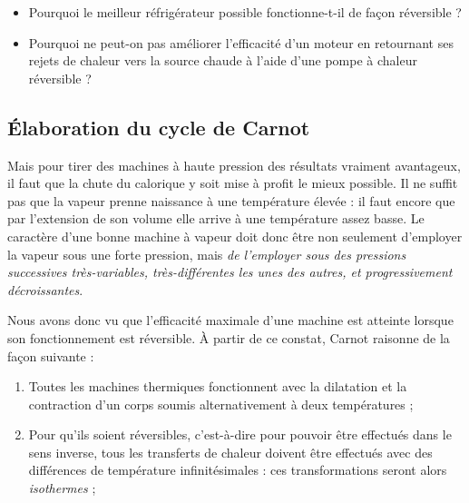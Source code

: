 		\begin{itemize}
			\item Pourquoi le meilleur réfrigérateur possible fonctionne-t-il de façon réversible ?
			\item Pourquoi ne peut-on pas améliorer l’efficacité d’un moteur en retournant ses rejets de chaleur vers la source chaude à l’aide d’une pompe à chaleur réversible ?
		\end{itemize}


	\subsection{Élaboration du cycle de Carnot}
	\label{ch_elaboration_cycle_carnot}

			Mais pour tirer des machines à haute pression des résultats vraiment avantageux, il faut que la chute du calorique y soit mise à profit le mieux possible. Il ne suffit pas que la vapeur prenne naissance à une température élevée : il faut encore que par l’extension de son volume elle arrive à une température assez basse. Le caractère d’une bonne machine à vapeur doit donc être non seulement d’employer la vapeur sous une forte pression, mais \emph{de l’employer sous des pressions successives très-variables, très-différentes les unes des autres, et progressivement décroissantes}.
		
		Nous avons donc vu que l’efficacité maximale d’une machine est atteinte lorsque son fonctionnement est réversible. À partir de ce constat, Carnot raisonne de la façon suivante :

		\begin{enumerate}
			\item Toutes les machines thermiques fonctionnent avec la dilatation et la contraction d’un corps soumis alternativement à deux températures ;
			\item Pour qu’ils soient réversibles, c’est-à-dire pour pouvoir être effectués dans le sens inverse, tous les transferts de chaleur doivent être effectués avec des différences de température infinitésimales : ces transformations seront alors \emph{isothermes} ;
		\end{enumerate}\vspace{-0.7em}%
		
